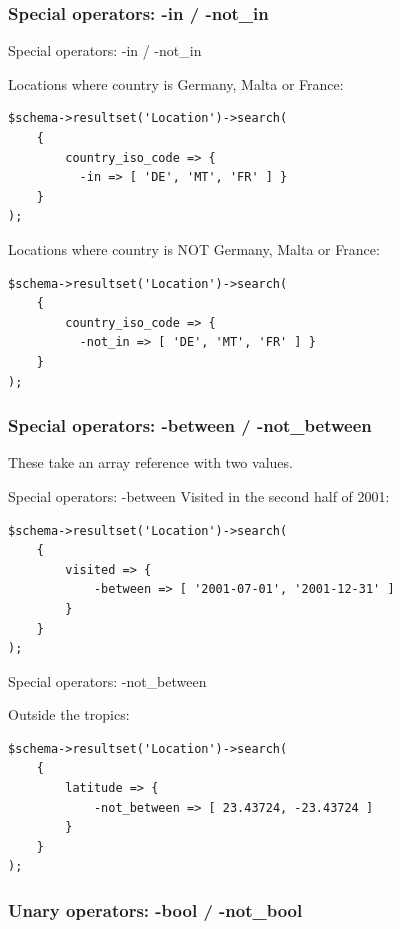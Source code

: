 \subsubsection{Special operators: -in / -not\_in}
\begin{frame}[fragile]{Special operators: -in / -not\_in}

Locations where country is Germany, Malta or France:

\begin{lstlisting}
$schema->resultset('Location')->search(
    {
        country_iso_code => { 
          -in => [ 'DE', 'MT', 'FR' ] }
    }
);
\end{lstlisting}

Locations where country is NOT Germany, Malta or France:

\begin{lstlisting}
$schema->resultset('Location')->search(
    {
        country_iso_code => { 
          -not_in => [ 'DE', 'MT', 'FR' ] }
    }
);
\end{lstlisting}
\end{frame}

\subsubsection{Special operators: -between / -not\_between}

These take an array reference with two values.

\begin{frame}[fragile]{Special operators: -between}
Visited in the second half of 2001:

\begin{lstlisting}
$schema->resultset('Location')->search(
    {
        visited => {
            -between => [ '2001-07-01', '2001-12-31' ]
        }
    }
);
\end{lstlisting}
\end{frame}

\begin{frame}[fragile]{Special operators: -not\_between}

Outside the tropics:

\begin{lstlisting}
$schema->resultset('Location')->search(
    {
        latitude => {
            -not_between => [ 23.43724, -23.43724 ]
        }
    }
);
\end{lstlisting}
\end{frame}

\subsubsection{Unary operators: -bool / -not\_bool}

